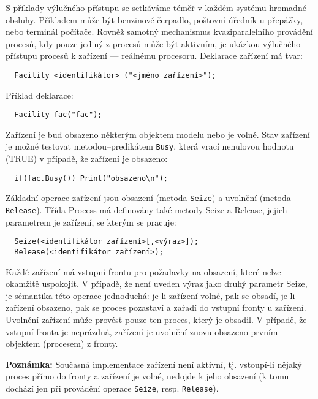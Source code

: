 \documentclass[a4paper]{article}
\begin{document}
S příklady výlučného přístupu se setkáváme téměř v každém systému hromadné
obsluhy. Příkladem může být benzinové čerpadlo, poštovní úředník u přepážky,
nebo terminál počítače. Rovněž samotný mechanismus kvaziparalelního provádění
procesů, kdy pouze jediný z procesů může být aktivním, je ukázkou výlučného
přístupu procesů k zařízení --- reálnému procesoru. Deklarace zařízení má tvar:

\begin{verbatim}
  Facility <identifikátor> ("<jméno zařízení>");
\end{verbatim}

Příklad deklarace:

\begin{verbatim}
  Facility fac("fac");
\end{verbatim}

Zařízení je buď obsazeno některým objektem modelu nebo je volné.
Stav zařízení je možné testovat metodou--predikátem \verb|Busy|, která vrací
nenulovou hodnotu (TRUE) v případě, že zařízení je obsazeno:

\begin{verbatim}
  if(fac.Busy()) Print("obsazeno\n");
\end{verbatim}

Základní operace zařízení jsou obsazení (metoda \verb|Seize|)
a uvolnění (metoda \verb|Release|). Třída Process má definovány také
metody Seize a Release, jejich parametrem je zařízení, se
kterým se pracuje:

\begin{verbatim}
  Seize(<identifikátor zařízení>[,<výraz>]);
  Release(<identifikátor zařízení>);
\end{verbatim}


Každé zařízení má vstupní frontu pro požadavky na obsazení,
které nelze okamžitě uspokojit. V případě, že není uveden výraz
jako druhý parametr Seize, je sémantika této operace
jednoduchá: je-li zařízení volné, pak se obsadí, je-li zařízení
obsazeno, pak se proces pozastaví a zařadí do vstupní fronty
u zařízení. Uvolnění zařízení může provést pouze ten proces,
který je obsadil. V případě, že vstupní fronta je neprázdná,
zařízení je uvolnění znovu obsazeno prvním objektem (procesem)
z fronty.

\bigskip
\noindent
{\bf Poznámka:} Současná implementace zařízení není
aktivní, tj. vstoupí-li nějaký proces přímo do fronty a zařízení je volné,
nedojde k jeho obsazení (k tomu dochází jen při provádění operace \verb|Seize|,
resp. \verb|Release|).
\end{document}
